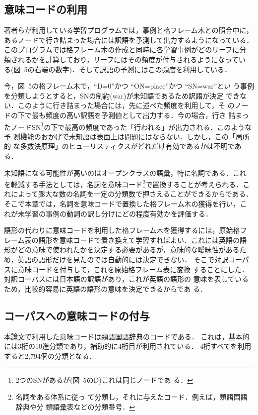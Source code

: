 \subsection{意味コードの利用}

著者らが利用している学習プログラムでは，事例と格フレーム木との照合中に，
あるノードで行き詰まった場合には訳語を予測して出力するようになっている．
このプログラムでは格フレーム木の作成と同時に各学習事例がどのリーフに分
類されるかを計算しており，リーフにはその頻度が付与されるようになってい
る(図~5の右端の数字)．そして訳語の予測にはこの頻度を利用している．

今，図~5の格フレーム木で，``D=0''かつ ``ON=place''かつ ``SN=war''とい
う事例を分類しようとすると，SNの制約(war)が未知語であるため訳語が決定
できない．このように行き詰まった場合には，先に述べた頻度を利用して，そ
のノードの下で最も頻度の高い訳語を予測値として出力する．今の場合，行き
詰まったノードSN\footnote{2つのSNがあるが(図~5のD)これは同じノードであ
  る．}の下で最高の頻度であった「行われる」が出力される．このような予
測機能のおかげで未知語は表面上は問題にはならない．しかし，この「局所的
な多数決原理」のヒューリスティクスがどれだけ有効であるかは不明である．

未知語になる可能性が高いのはオープンクラスの語彙，特に名詞である．これ
を軽減する手法としては，名詞を意味コード\footnote{名詞をある体系に従っ
  て分類し，それに与えたコード．例えば，類語国語辞典\cite{類語85}や分
  類語彙表\cite{分類64}などの分類番号．}で置換することが考えられる．こ
れによって膨大な数の名詞を一定の分類数で押さえることができるからである．
そこで本章では，名詞を意味コードで置換した格フレーム木の獲得を行い，こ
れが未学習の事例の動詞の訳し分けにどの程度有効かを評価する．

語形の代わりに意味コードを利用した格フレーム木を獲得するには，原始格フ
レーム表の語形を意味コードで置き換えて学習すればよい．これには英語の語
形がどの意味で使われたかを決定する必要があるが，意味的な曖昧性があるた
め，英語の語形だけを見たのでは自動的には決定できない．
そこで対訳コーパスに意味コードを付与して，これを原始格フレーム表に変換
することにした．対訳コーパスには日本語の訳語があり，これが英語の語形の
意味を表しているため，比較的容易に英語の語形の意味を決定できるからであ
る．

\subsection{コーパスへの意味コードの付与}

本論文で利用した意味コードは類語国語辞典\cite{類語85}のコードである．
これは，基本的には3桁の10進分類であり，補助的に4桁目が利用されている．
4桁すべてを利用すると2,794個の分類となる．

